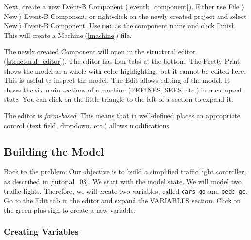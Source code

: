 
Next, create a new Event-B Component (\ref{eventb_component}).  Either use \textsf{File $\rangle$ New $\rangle$ Event-B Component}, or right-click on the newly created project and select \textsf{New $\rangle$ Event-B Component}.  Use \texttt{mac} as the component name and click \textsf{Finish}.  This will create a Machine (\ref{machine}) file.

The newly created Component will open in the structural editor (\ref{structural_editor}).  The editor has four tabs at the bottom.  The \textsf{Pretty Print} shows the model as a whole with color highlighting, but it cannot be edited here.  This is useful to inspect the model.  The \textsf{Edit} allows editing of the model.  It shows the six main sections of a machine (REFINES, SEES, etc.) in a collapsed state.  You can click on the little triangle to the left of a section to expand it.

The editor is \textit{form-based}.  This means that in well-defined places an appropriate control (text field, dropdown, etc.) allows modifications.



\subsection{Building the Model}

Back to the problem: Our objective is to build a simplified traffic light controller, as described in \ref{tutorial_03}.  We start with the model state.  We will model two traffic lights.  Therefore, we will create two variables, called \texttt{cars\_go} and \texttt{peds\_go}.  Go to the \textsf{Edit} tab in the editor and expand the \textsf{VARIABLES} section.  Click on the green plus-sign to create a new variable.

\subsubsection{Creating Variables}

